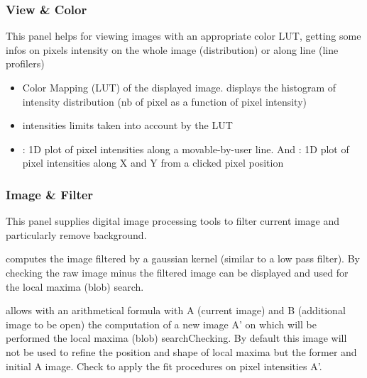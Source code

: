 \documentclass[letterpaper,10pt,english]{sphinxmanual}
\begin{document}
\subsubsection{View \& Color}
\label{\detokenize{PeakSearchGUI:view-color}}
This panel helps for viewing images with an appropriate color LUT, getting some infos on pixels intensity on the whole image (distribution) or along line (line profilers)
\begin{itemize}
\item {} 
Color Mapping (LUT) of the displayed image.  displays the histogram of intensity distribution (nb of pixel as a function of pixel intensity)
\begin{quote}

\noindent{}
\end{quote}

\item {} 
intensities limits taken into account by the LUT
\begin{quote}

\noindent{}
\end{quote}

\item {} 
: 1D plot of pixel intensities along a movable-by-user line. And : 1D plot of pixel intensities along X and Y from a clicked pixel position

\end{itemize}

\noindent{}


\subsubsection{Image \& Filter}
\label{\detokenize{PeakSearchGUI:image-filter}}
This panel supplies digital image processing tools to filter current image and particularly remove background.

 computes the image filtered by a gaussian kernel (similar to a low pass filter). By checking  the raw image minus the filtered image can be displayed and used for the local maxima (blob) search.

 allows with an arithmetical formula with A (current image) and B (additional image to be open) the computation of a new image A’ on which will be performed the local maxima (blob) searchChecking. By default this image will not be used to refine the position and shape of local maxima but the former and initial A image. Check  to apply the fit procedures on pixel intensities A’.
\end{document}
